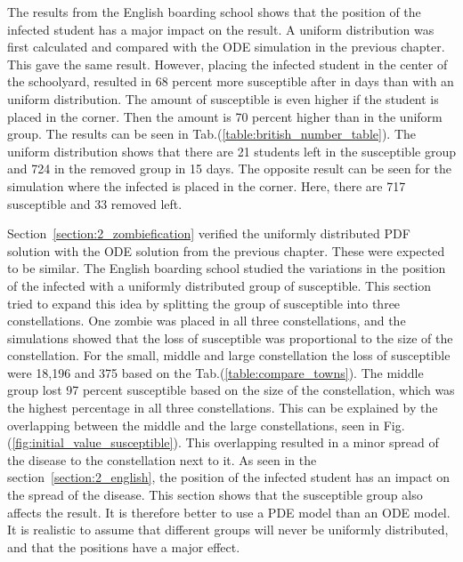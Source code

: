 \documentclass[%
twoside,                 %
final,                   %
chapterprefix=true,      %
open=right               %
10pt]{book}
\begin{document}
\vspace{3mm}




\vspace{3mm}


The results from the English boarding school shows that the position of the infected student has a major impact on the result. A uniform distribution was first calculated and compared with the ODE simulation in the previous chapter. This gave the same result. However, placing the infected student in the center of the schoolyard, resulted in 68 percent more susceptible after in days than with an uniform distribution. The amount of susceptible is even higher if the student is placed in the corner. Then the amount is 70 percent higher than in the uniform group. The results can be seen in Tab.(\ref{table:british_number_table}). The uniform distribution shows that there are 21 students left in the susceptible group and 724 in the removed group in 15 days. The opposite result can be seen for the simulation where the infected is placed in the corner. Here, there are 717 susceptible and 33 removed left. 


\vspace{3mm}




\vspace{3mm}


Section~\ref{section:2_zombiefication} verified the uniformly distributed PDF solution with the ODE solution from the previous chapter. These were expected to be similar. The English boarding school studied the variations in the position of the infected with a uniformly distributed group of susceptible. This section tried to expand this idea by splitting the group of susceptible into three constellations. One zombie was placed in all three constellations, and the simulations showed that the loss of susceptible was proportional to the size of the constellation. For the small, middle and large constellation the loss of susceptible were 18,196 and 375 based on the Tab.(\ref{table:compare_towns}). The middle group lost 97 percent susceptible based on the size of the constellation, which was the highest percentage in all three constellations. This can be explained by the overlapping between the middle and the large constellations, seen in Fig.(\ref{fig:initial_value_susceptible}). This overlapping resulted in a minor spread of the disease to the constellation next to it. As seen in the section~\ref{section:2_english}, the position of the infected student has an impact on the spread of the disease. This section shows that the susceptible group also affects the result. It is therefore better to use a PDE model than an ODE model. It is realistic to assume that different groups will never be uniformly distributed, and that the positions have a major effect.
\end{document}
